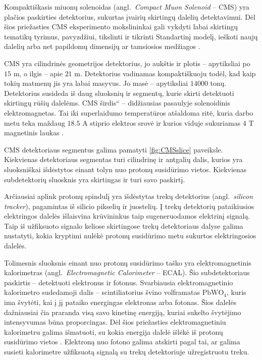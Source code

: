\documentclass[a4paper, 12pt]{article}
\newcommand{\ltq}[1]{{\quotedblbase{}#1\textquotedblleft{}}}
\newlength\q
\begin{document}
Kompaktiškasis miuonų solenoidas (angl.\ \textit{Compact Muon Solenoid} -- CMS) yra plačios paskirties
detektorius, sukurtas įvairių skirtingų dalelių detektavimui.
Dėl šios priežasties CMS eksperimento mokslininkai gali vykdyti labai skirtingų tematikų tyrimus,
pavyzdžiui, tikslinti ir tikrinti Standartinį modelį, ieškoti naujų dalelių arba net papildomų
dimensijų ar tamsiosios medžiagos \cite{aboutCMS}.

CMS yra cilindrinės geometrijos detektorius, jo aukštis ir plotis -- apytiksliai po $15$ m, o ilgis --
apie $21$ m. Detektorius vadinamas kompaktiškuoju todėl, kad kaip tokių matmenų jis yra labai masyvus.
Jo masė -- apytiksliai $14000$ tonų.
Detektorius susideda iš daug sluoksnių ir segmentų, kurie skirti detektuoti skirtingų rūšių dalelėms.
CMS \ltq{širdis} -- didžiausias pasaulyje solenoidinis elektromagnetas.
Tai iki superlaidumo temperatūros atšaldoma ritė, kuria darbo metu teka maždaug $18.5$ A stiprio
elektros srovė ir kurios viduje sukuriamas $4$ T magnetinis laukas \cite{CMSdetector}.

CMS detektoriaus segmentus galima pamatyti \ref{fig:CMSslice} paveiksle.
Kiekvienas detektoriaus segmentas turi cilindrinę ir antgalių dalis, kurios yra sluoksniškai išdėstytos
einant tolyn nuo protonų susidūrimo vietos.
Kiekvienas subdetektorių sluosknis yra skirtingas ir turi savo paskirtį.

Arčiausiai aplink protonų spindulį yra išdėstytas trekų detektorius (angl.\ \textit{silicon tracker}),
pagamintas iš silicio pikselių ir juostelių.
Į trekų detektorių pataikiusios elektringos dalelės išlaisvina krūvininkus taip sugeneruodamos elektrinį
signalą.
Taip iš užfiksuoto signalo keliose skirtingose trekų detektoriaus dalyse galima nustatyti, kokia kryptimi
nulėkė protonų susidūrimo metu sukurtos elektringosios dalelės.

Tolimesnis sluoksnis einant nuo protonų susidūrimo taško yra elektromagnetinis kalorimetras (angl.\
\textit{Electromagnetic Calorimeter} -- ECAL).
Šio subdetektoriaus paskirtis -- detektuoti elektronus ir fotonus.
Svarbiausia elektromagnetinio kalorimetro sudedamoji dalis -- scintiliatorius švino volframatas $\mathrm{PbWO}_{4}$,
kuris ima švytėti, kai į jį pataiko energingas elektronas arba fotonas.
Šios dalelės dažniausiai čia praranda visą savo kinetinę energiją, kuriai sukelto švytėjimo intensyvumas
būna proporcingas.
Dėl šios priežasties elektromagnetiniu kalorimetru galima išmatuoti, su kokia energija dalelė išlėkė iš
protonų susidūrimo vietos \cite{Ecal}.
Elektroną nuo fotono galima atskirti pagal tai, ar galima susieti kalorimetre užfiksuotą signalą su trekų
detektoriuje užregistruotu treku.
\end{document}
